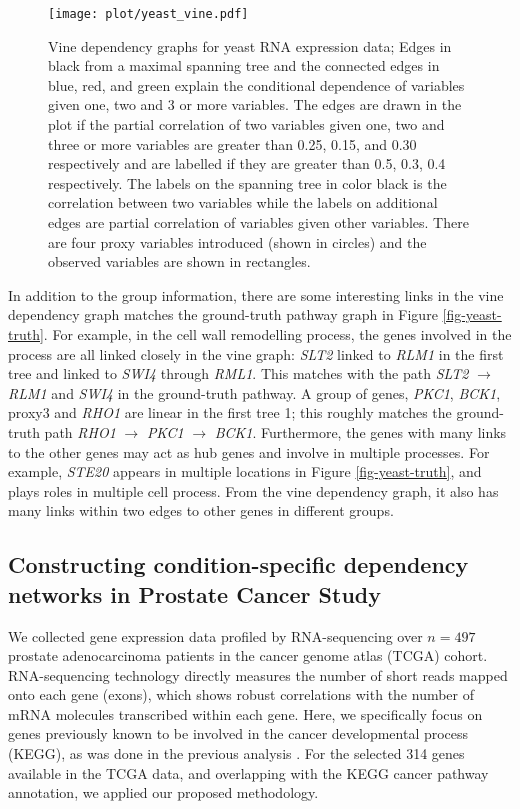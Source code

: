 \documentclass[a4paper]{article}
\begin{document}
\begin{figure}[!ht]
\centering
\texttt{[image: plot/yeast\_vine.pdf]}
\caption{\footnotesize{Vine dependency graphs for yeast RNA expression data;  Edges in black from a maximal spanning tree and the connected  edges in blue, red, and green explain the conditional dependence of variables given one, two and 3 or more variables. 
The edges are drawn in the plot if the partial correlation of two variables given one, two and three or more variables are greater than 0.25, 0.15, and 0.30 respectively and are labelled if they are greater than 0.5, 0.3, 0.4 respectively. The labels on the spanning tree in color black is the correlation between two variables while the labels on additional edges are partial correlation of variables given other variables. 
There are four
proxy variables introduced (shown in circles) and the observed variables are shown in rectangles.} }
\label{fig-yeast-dependence}
\end{figure}

In addition to the group information, there are some interesting links
in the vine dependency graph matches the ground-truth pathway graph in
Figure \ref{fig-yeast-truth}.  For example, in the cell wall
remodelling process, the genes involved in the process are all linked
closely in the vine graph: \textit{SLT2} linked to \textit{RLM1} in
the first tree and linked to \textit{SWI4} through \textit{RML1}.
This matches with the path \textit{SLT2} $\longrightarrow$
\textit{RLM1} and \textit{SWI4} in the ground-truth pathway.  A group
of genes, \textit{PKC1}, \textit{BCK1}, proxy3 and \textit{RHO1} are
linear in the first tree 1; this roughly matches the ground-truth path
\textit{RHO1} $\longrightarrow$ \textit{PKC1} $\longrightarrow$
\textit{BCK1}.  Furthermore, the genes with many links to the other
genes may act as hub genes and involve in multiple processes.  For
example, \textit{STE20} appears in multiple locations in Figure
\ref{fig-yeast-truth}, and plays roles in multiple cell process. From
the vine dependency graph, it also has many links within two edges to
other genes in different groups.

\subsection{Constructing condition-specific dependency networks in Prostate Cancer Study}
\label{sec-prostate}

We collected gene expression data profiled by RNA-sequencing over $n=497$
prostate adenocarcinoma patients in the cancer genome atlas (TCGA) cohort.
RNA-sequencing technology directly measures the number of short reads mapped
onto each gene (exons), which shows robust correlations with the number of
mRNA molecules transcribed within each gene.  Here, we specifically focus on
genes previously known to be involved in the cancer developmental process
(KEGG), as was done in the previous analysis \citep{lin2016estimation}. For
the selected 314 genes available in the TCGA data, and overlapping with the
KEGG cancer pathway annotation, we applied our proposed methodology.
\end{document}
